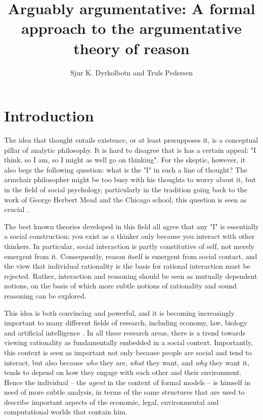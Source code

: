 \documentclass[greybox]{svmult}
\begin{document}
\title*{Arguably argumentative: A formal approach to the argumentative theory of reason}
\author{Sjur K. Dyrkolbotn and Truls Pedersen}
\maketitle

\section{Introduction}\label{sec:intro}

The idea that thought entails existence, or at least presupposes it, is a conceptual pillar of analytic philosophy. It is hard to disagree that is has a certain appeal: "I think, so I am, so I might as well go on thinking". For the skeptic, however, it also begs the following question: what is the "I" in such a line of thought? The armchair philosopher might be too busy with his thoughts to worry about it, but in the field of social psychology, particularly in the tradition going back to the work of George Herbert Mead and the Chicago school, this question is seen as crucial \cite{mead}.

The best known theories developed in this field all agree that any "I" is essentially a social construction; you exist as a thinker only because you interact with other thinkers. In particular, social interaction is partly constitutive of self, not merely emergent from it. Consequently, reason itself is emergent from social contact, and the view that individual rationality is the basis for rational interaction must be rejected. Rather, interaction and reasoning should be seen as mutually dependent notions, on the basis of which more subtle notions of rationality and sound reasoning can be explored.

This idea is both convincing and powerful, and it is becoming increasingly important to many different fields of research, including economy, law, biology and artificial intelligence \cite{blume,dworkin,waal,benthem,ossowski}. In all these research areas, there is a trend towards  viewing rationality as fundamentally embedded in a social context. Importantly, this context is seen as important not only because people are social and tend to interact, but also because \emph{who} they are, \emph{what} they want, and \emph{why} they want it, tends to depend on how they engage with each other and their environment. Hence the individual -- the \emph{agent} in the context of formal models -- is himself in need of more subtle analysis, in terms of the same structures that are used to describe important aspects of the economic, legal, environmental and computational worlds that contain him. 
\end{document}

